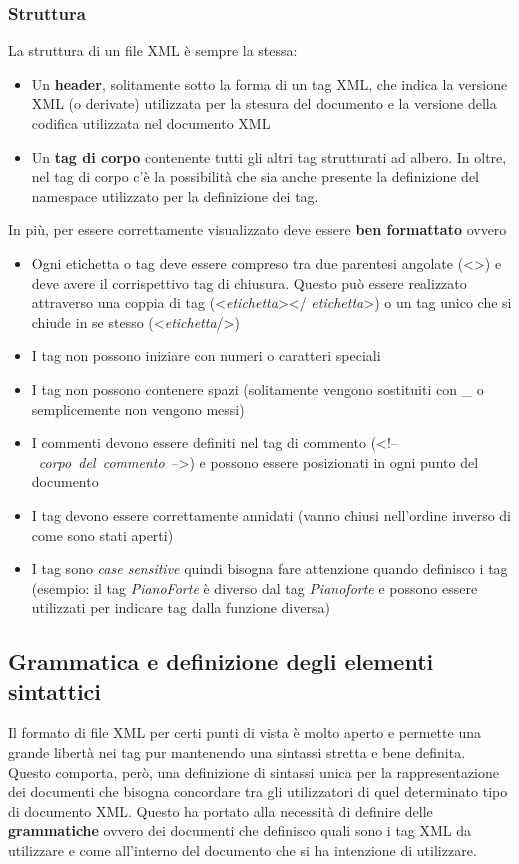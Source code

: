 \documentclass{article}
\begin{document}
\subsubsection{Struttura}
La struttura di un file XML è sempre la stessa:
\begin{itemize}
\item Un \textbf{header}, solitamente sotto la forma di un tag XML,  che indica la versione XML (o derivate) utilizzata per la stesura del documento e la versione della codifica utilizzata nel documento XML
\item Un \textbf{tag di corpo} contenente tutti gli altri tag strutturati ad albero. In oltre, nel tag di corpo c'è la possibilità che sia anche presente la definizione del namespace utilizzato per la definizione dei tag.
\end{itemize}
In più, per essere correttamente visualizzato deve essere \textbf{ben formattato} ovvero
\begin{itemize}
\item Ogni etichetta o tag deve essere compreso tra due parentesi angolate (<>) e deve avere il corrispettivo tag di chiusura. Questo può essere realizzato attraverso una coppia di tag (<\textit{etichetta}></ \textit{etichetta}>) o un tag unico che si chiude in se stesso (<\textit{etichetta}/>)
\item I tag non possono iniziare con numeri o caratteri speciali
\item I tag non possono contenere spazi (solitamente vengono sostituiti con \_ o semplicemente non vengono messi)
\item I commenti devono essere definiti nel tag di commento (<!--~\textit{corpo~del~commento}~-->) e possono essere posizionati in ogni punto del documento
\item I tag devono essere correttamente annidati (vanno chiusi nell'ordine inverso di come sono stati aperti)
\item I tag sono \textit{case sensitive} quindi bisogna fare attenzione quando definisco i tag (esempio: il tag \textit{PianoForte} è diverso dal tag \textit{Pianoforte} e possono essere utilizzati per indicare tag dalla funzione diversa)
\end{itemize}

\subsection{Grammatica e definizione degli elementi sintattici}
Il formato di file XML per certi punti di vista è molto aperto e permette una grande libertà nei tag pur mantenendo una sintassi stretta e bene definita.
Questo comporta, però, una definizione di sintassi unica per la rappresentazione dei documenti che bisogna concordare tra gli utilizzatori di quel determinato tipo di documento XML. Questo ha portato alla necessità di definire delle \textbf{grammatiche} ovvero dei documenti che definisco quali sono i tag XML da utilizzare e come all'interno del documento che si ha intenzione di utilizzare.
\end{document}
